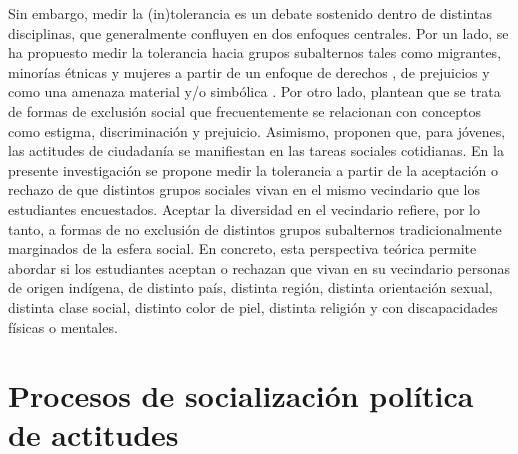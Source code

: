 \documentclass[12pt,twoside]{templates/facsothesis}
\begin{document}
Sin embargo, medir la (in)tolerancia es un debate sostenido dentro de distintas disciplinas, que generalmente confluyen en dos enfoques centrales. Por un lado, se ha propuesto medir la tolerancia hacia grupos subalternos tales como migrantes, minorías étnicas y mujeres a partir de un enfoque de derechos \citep{miranda_Political_2018, trevino_Influence_2018}, de prejuicios \citep{meeusen_ParentChild_2015, weber_educational_2020} y como una amenaza material y/o simbólica \citep{raijman_Perceived_2004}. Por otro lado, \citet{diez-nicolas_Exclusion_2019} plantean que se trata de formas de exclusión social que frecuentemente se relacionan con conceptos como estigma, discriminación y prejuicio. Asimismo, \citet{tendam_Measuring_2011} proponen que, para jóvenes, las actitudes de ciudadanía se manifiestan en las tareas sociales cotidianas. En la presente investigación se propone medir la tolerancia a partir de la aceptación o rechazo de que distintos grupos sociales vivan en el mismo vecindario que los estudiantes encuestados. Aceptar la diversidad en el vecindario refiere, por lo tanto, a formas de no exclusión de distintos grupos subalternos tradicionalmente marginados de la esfera social. En concreto, esta perspectiva teórica permite abordar si los estudiantes aceptan o rechazan que vivan en su vecindario personas de origen indígena, de distinto país, distinta región, distinta orientación sexual, distinta clase social, distinto color de piel, distinta religión y con discapacidades físicas o mentales.

\hypertarget{procesos-de-socializaciuxf3n-poluxedtica-de-actitudes}{%
\section{Procesos de socialización política de actitudes}\label{procesos-de-socializaciuxf3n-poluxedtica-de-actitudes}}
\end{document}

